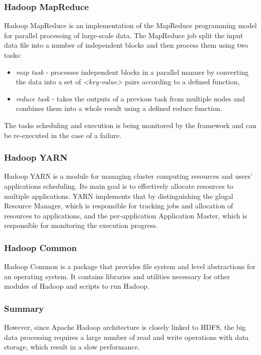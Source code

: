 \subsubsection{Hadoop MapReduce}
Hadoop MapReduce is an implementation of the MapReduce programming model for parallel processing of large-scale data. The MapReduce job split the input data file into a number of independent blocks and then process them using two tasks:
\begin{itemize}
	\item \textit{map task} - processes independent blocks in a parallel manner by converting the data into a set of \textit{<key-value>} pairs according to a defined function,
	\item \textit{reduce task} - takes the outputs of a previous task from multiple nodes and combines them into a whole result using a defined reduce function.
\end{itemize}
The tasks scheduling and execution is being monitored by the framework and can be re-executed in the case of a failure.

\subsubsection{Hadoop YARN}
Hadoop YARN is a module for managing cluster computing resources and users’ applications scheduling. Its main goal is to effectively allocate resources to multiple applications. YARN implements that by distinguishing the glogal Resource Manager, which is responsible for tracking jobs and allocation of resources to applications, and the per-application Application Master, which is responsible for monitoring the execution progress.

\subsubsection{Hadoop Common}
Hadoop Common is a package that provides file system and level abstractions for an operating system. It contains libraries and utilities necessary for other modules of Hadoop and scripts to run Hadoop.

\subsubsection{Summary}
However, since Apache Hadoop architecture is closely linked to HDFS, the big data processing requires a large number of read and write operations with data storage, which result in a slow performance. 


